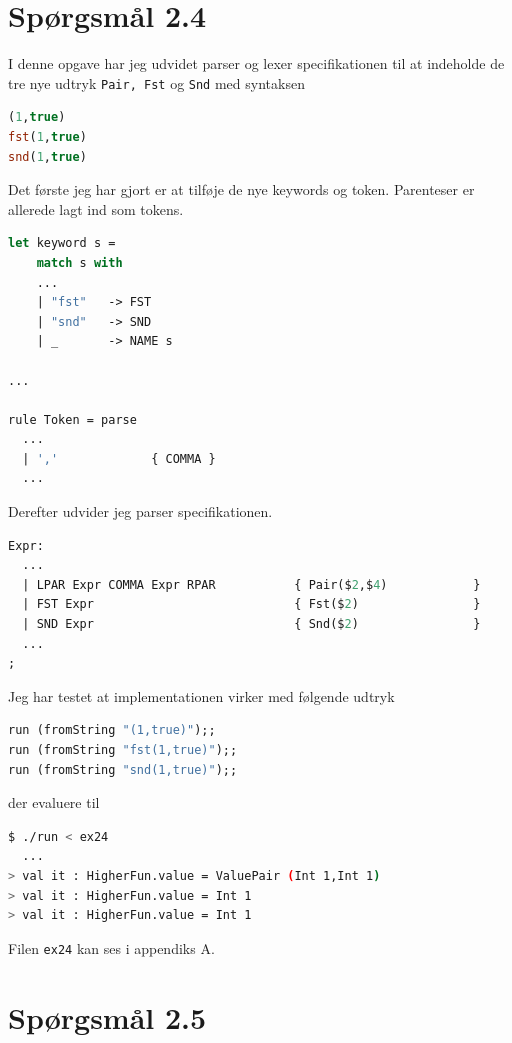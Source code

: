 \documentclass[danish,a4paper]{report}
\begin{document}
\section*{Spørgsmål 2.4}

I denne opgave har jeg udvidet parser og lexer specifikationen til at indeholde de tre nye udtryk \texttt{Pair, Fst} og \texttt{Snd} med syntaksen

\begin{lstlisting}[language=ML]
(1,true)
fst(1,true)
snd(1,true)
\end{lstlisting}

Det første jeg har gjort er at tilføje de nye keywords og token. Parenteser er allerede lagt ind som tokens. 

\begin{lstlisting}[language=ML]
let keyword s =
    match s with
    ...
    | "fst"   -> FST
    | "snd"   -> SND
    | _       -> NAME s 

...

rule Token = parse
  ...
  | ','             { COMMA }
  ...
\end{lstlisting}

Derefter udvider jeg parser specifikationen.

\begin{lstlisting}[language=ML]
Expr:
  ...
  | LPAR Expr COMMA Expr RPAR           { Pair($2,$4)            }
  | FST Expr                            { Fst($2)                }
  | SND Expr                            { Snd($2)                }
  ...
;
\end{lstlisting}

Jeg har testet at implementationen virker med følgende udtryk

\begin{lstlisting}[language=ML]
run (fromString "(1,true)");;
run (fromString "fst(1,true)");;
run (fromString "snd(1,true)");;
\end{lstlisting}

der evaluere til

\begin{lstlisting}[language=bash]
$ ./run < ex24
  ...
> val it : HigherFun.value = ValuePair (Int 1,Int 1)
> val it : HigherFun.value = Int 1
> val it : HigherFun.value = Int 1
\end{lstlisting}

Filen \texttt{ex24} kan ses i appendiks A.

\section*{Spørgsmål 2.5}
\end{document}
